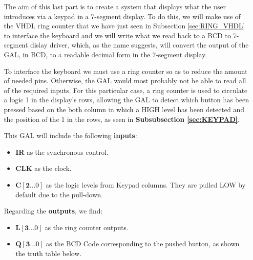The aim of this last part is to create a system that displays what the user introduces via a keypad in a 7-segment display. To do this, we will make use of the VHDL ring counter that we have just seen in Subsection \ref{sec:RING_VHDL} to interface the keyboard and we will write what we read back to a BCD to 7-segment dislay driver, which, as the name suggests, will convert the output of the GAL, in BCD, to a readable decimal form in the 7-segment display.\medskip

To interface the keyboard we must use a ring counter so as to reduce the amount of needed pins. Otherwise, the GAL would most probably not be able to read all of the required inputs. For this particular case, a ring counter is used to circulate a logic 1 in the display's rows, allowing the GAL to detect which button has been pressed based on the both column in which a HIGH level has been detected and the position of the 1 in the rows, as seen in \textbf{Subsubsection \ref{sec:KEYPAD}}.\medskip

This GAL will include the following \textbf{inputs}:

\begin{itemize}
    \item \textbf{IR} as the synchronous control.
    \item \textbf{CLK} as the clock.
    \item $\mathbf{C\left[ 2...0 \right]}$ as the logic levels from Keypad columns. They are pulled LOW by default due to the pull-down.
\end{itemize}

Regarding the \textbf{outputs}, we find:

\begin{itemize}
    \item $\mathbf{L\left[ 3...0 \right]}$ as the ring counter outputs. 
    \item $\mathbf{Q\left[ 3...0 \right]}$ as the BCD Code corresponding to the pushed button, as shown the truth table below. 
\end{itemize}



